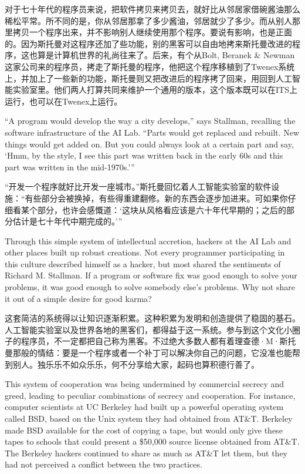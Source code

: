 \ifdefined\chs
对于七十年代的程序员来说，把软件拷贝来拷贝去，就好比从邻居家借碗酱油那么稀松平常。所不同的是，你从邻居那拿了多少酱油，邻居就少了多少。而从别人那里拷贝一个程序出来，并不影响别人继续使用那个程序。要说有影响，也是正面的。因为斯托曼对这程序还加了些功能，别的黑客可以自由地拷来斯托曼改进的程序，这也算是计算机世界的礼尚往来了。后来，有个从Bolt, Beranek \& Newman这家公司来的程序员，拷走了斯托曼的程序，他把这个程序移植到了Twenex系统上，并加上了一些新的功能，斯托曼则又把改进后的程序拷了回来，用回到人工智能实验室里。他们两人打算共同来维护一个通用的版本，这个版本既可以在ITS上运行，也可以在Twenex上运行。
\fi

\ifdefined\eng
``A program would develop the way a city develops,'' says Stallman, recalling the software infrastructure of the AI Lab. ``Parts would get replaced and rebuilt. New things would get added on. But you could always look at a certain part and say, `Hmm, by the style, I see this part was written back in the early 60s and this part was written in the mid-1970s.'\hspace{0.01in}''
\fi

\ifdefined\chs
“开发一个程序就好比开发一座城市。”斯托曼回忆着人工智能实验室的软件设施：“有些部分会被换掉，有些得重建翻修。新的东西会逐步加进来。可如果你仔细看某个部分，也许会感慨道：‘这块从风格看应该是六十年代早期的；之后的部分估计是七十年代中期完成的。’”
\fi

\ifdefined\eng
Through this simple system of intellectual accretion, hackers at the AI Lab and other places built up robust creations. Not every programmer participating in this culture described himself as a hacker, but most shared the sentiments of Richard M. Stallman. If a program or software fix was good enough to solve your problems, it was good enough to solve somebody else's problems. Why not share it out of a simple desire for good karma?
\fi

\ifdefined\chs
这套简洁的系统得以让知识逐渐积累。这种积累为发明和创造提供了稳固的基石。人工智能实验室以及世界各地的黑客们，都得益于这一系统。参与到这个文化小圈子的程序员，不一定都把自己称为黑客。不过绝大多数人都有着理查德·M·斯托曼那般的情结：要是一个程序或者一个补丁可以解决你自己的问题，它没准也能帮到别人。独乐乐不如众乐乐，何不分享给大家，起码也算积德行善了。
\fi

\ifdefined\eng
This system of cooperation was being undermined by commercial secrecy and greed, leading to peculiar combinations of secrecy and cooperation.  For instance, computer scientists at UC Berkeley had built up a powerful operating system called BSD, based on the Unix system they had obtained from AT\&T.  Berkeley made BSD available for the cost of copying a tape, but would only give these tapes to schools that could present a \$50,000 source license obtained from AT\&T.  The Berkeley hackers continued to share as much as AT\&T let them, but they had not perceived a conflict between the two practices.
\fi

